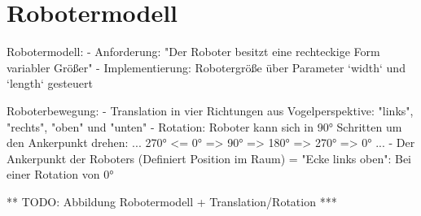 \chapter{Robotermodell}

Robotermodell:
- Anforderung: "Der Roboter besitzt eine rechteckige Form variabler Größer"
- Implementierung: Robotergröße über Parameter `width` und `length` gesteuert

Roboterbewegung:
- Translation in vier Richtungen aus Vogelperspektive: "links", "rechts", "oben" und "unten"
- Rotation: Roboter kann sich in 90° Schritten um den Ankerpunkt drehen: ... 270° <= 0° => 90° => 180° => 270° => 0° ...
- Der Ankerpunkt der Roboters (Definiert Position im Raum) = "Ecke links oben": Bei einer Rotation von 0°

** TODO: Abbildung Robotermodell + Translation/Rotation ***
